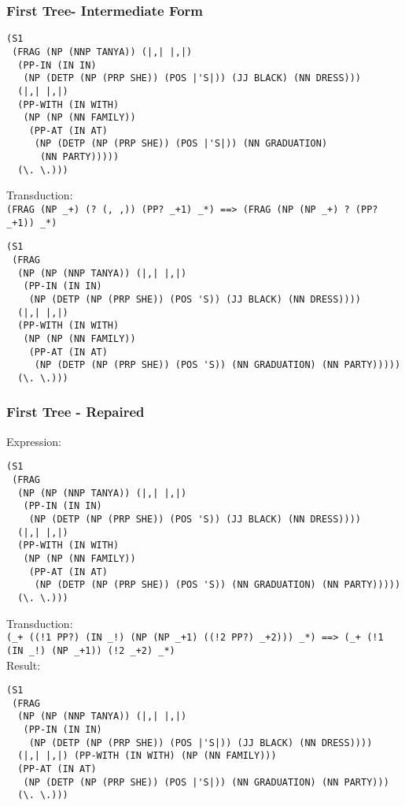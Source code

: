 \begin{frame}[fragile]
  \frametitle{First Tree- Intermediate Form}
\begin{verbatim}
(S1
 (FRAG (NP (NNP TANYA)) (|,| |,|)
  (PP-IN (IN IN)
   (NP (DETP (NP (PRP SHE)) (POS |'S|)) (JJ BLACK) (NN DRESS)))
  (|,| |,|)
  (PP-WITH (IN WITH)
   (NP (NP (NN FAMILY))
    (PP-AT (IN AT)
     (NP (DETP (NP (PRP SHE)) (POS |'S|)) (NN GRADUATION)
      (NN PARTY)))))
  (\. \.))) 
\end{verbatim}

  Transduction:\\
  \texttt{(FRAG (NP \_+) (? (, ,)) (PP? \_+1) \_*) ==> (FRAG (NP (NP \_+) ? (PP? \_+1)) \_*)}\\

\begin{verbatim}
(S1
 (FRAG
  (NP (NP (NNP TANYA)) (|,| |,|)
   (PP-IN (IN IN)
    (NP (DETP (NP (PRP SHE)) (POS 'S)) (JJ BLACK) (NN DRESS))))
  (|,| |,|)
  (PP-WITH (IN WITH)
   (NP (NP (NN FAMILY))
    (PP-AT (IN AT)
     (NP (DETP (NP (PRP SHE)) (POS 'S)) (NN GRADUATION) (NN PARTY)))))
  (\. \.))) 
\end{verbatim}
\end{frame}

\begin{frame}[fragile]
  \frametitle{First Tree - Repaired}
  Expression:\\
\begin{verbatim}
(S1
 (FRAG
  (NP (NP (NNP TANYA)) (|,| |,|)
   (PP-IN (IN IN)
    (NP (DETP (NP (PRP SHE)) (POS 'S)) (JJ BLACK) (NN DRESS))))
  (|,| |,|)
  (PP-WITH (IN WITH)
   (NP (NP (NN FAMILY))
    (PP-AT (IN AT)
     (NP (DETP (NP (PRP SHE)) (POS 'S)) (NN GRADUATION) (NN PARTY)))))
  (\. \.))) 
\end{verbatim}

  Transduction:\\
  \texttt{(\_+ ((!1 PP?) (IN \_!) (NP (NP \_+1) ((!2 PP?) \_+2))) \_*) ==> (\_+ (!1 (IN \_!) (NP \_+1)) (!2 \_+2) \_*)}\\  

Result:\\  
\begin{verbatim}
(S1
 (FRAG
  (NP (NP (NNP TANYA)) (|,| |,|)
   (PP-IN (IN IN)
    (NP (DETP (NP (PRP SHE)) (POS |'S|)) (JJ BLACK) (NN DRESS))))
  (|,| |,|) (PP-WITH (IN WITH) (NP (NN FAMILY)))
  (PP-AT (IN AT)
   (NP (DETP (NP (PRP SHE)) (POS |'S|)) (NN GRADUATION) (NN PARTY)))
  (\. \.))) 
\end{verbatim}
\end{frame}

